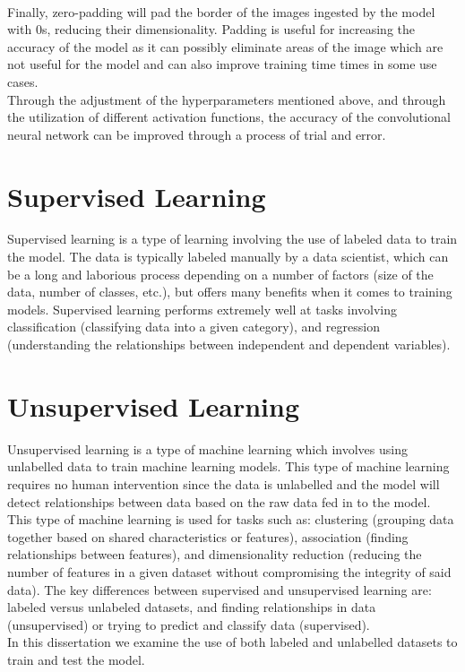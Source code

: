 \\
Finally, zero-padding will pad the border of the images ingested by the model with 0s, reducing their dimensionality. Padding is useful for increasing the accuracy of the model as it can possibly eliminate areas of the image which are not useful for the model and can also improve training time times in some use cases.\cite{zeroPaddingTrainingTime}
\\
Through the adjustment of the hyperparameters mentioned above, and through the utilization of different activation functions, the accuracy of the convolutional neural network can be improved through a process of trial and error.
\section{Supervised Learning}
Supervised learning is a type of learning involving the use of labeled data to train the model\cite{supervisedVsUnsupervised}. The data is typically labeled manually by a data scientist, which can be a long and laborious process depending on a number of factors (size of the data, number of classes, etc.), but offers many benefits when it comes to training models.  Supervised learning performs extremely well at tasks involving classification (classifying data into a given category), and regression (understanding the relationships between independent and dependent variables). 
\section{Unsupervised Learning}
Unsupervised learning is a type of machine learning which involves using unlabelled data to train machine learning models\cite{supervisedVsUnsupervised}.  This type of machine learning requires no human intervention since the data is unlabelled and the model will detect relationships between data based on the raw data fed in to the model.  This type of machine learning is used for tasks such as: clustering (grouping data together based on shared characteristics or features), association (finding relationships between features), and dimensionality reduction (reducing the number of features in a given dataset without compromising the integrity of said data).  The key differences between supervised and unsupervised learning are: labeled versus unlabeled datasets, and finding relationships in data (unsupervised) or trying to predict and classify data (supervised).
\\
In this dissertation we examine the use of both labeled and unlabelled datasets to train and test the model.
